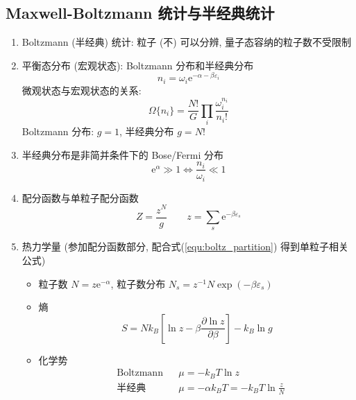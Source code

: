 \documentclass[12pt,a4paper]{article}%
\numberwithin{equation}{section}
\newcommand\e{\mathrm{e}}%
\begin{document}
\subsection[Boltzmann (半经典) 统计]{Maxwell-Boltzmann 统计与半经典统计} %
\label{sub:boltzmann_stat}
\begin{enumerate}
    \item Boltzmann (半经典) 统计: 粒子 (不) 可以分辨, 量子态容纳的粒子数不受限制
    \item 平衡态分布 (宏观状态): Boltzmann 分布和半经典分布
    \begin{equation}
        n_i = \omega_i\e^{-\alpha-\beta\varepsilon_i}
    \end{equation}
    微观状态与宏观状态的关系: 
    \begin{equation}
        \Omega\{n_i\} = \frac{N!}{G}\prod_i \frac{\omega_i^{n_i}}{n_i!}
    \end{equation}
    Boltzmann 分布: $g = 1$, 半经典分布 $g = N!$
    \item 半经典分布是非简并条件下的 Bose/Fermi 分布
    \begin{equation}
        \e^\alpha\gg 1 \Longleftrightarrow \frac{n_i}{\omega_i}\ll 1 %
    \end{equation}
    \item 配分函数与单粒子配分函数
    \begin{equation}\label{equ:boltz_partition}
        Z = \frac{z^N}{g}\qquad z = \sum_s\e^{-\beta\varepsilon_s}
    \end{equation}
    \item 热力学量 (参加配分函数部分, 配合式(\ref{equ:boltz_partition}) 得到单粒子相关公式)
    \begin{itemize}
        \item 粒子数 $N = z\e^{-\alpha}$, 粒子数分布 $N_s = z^{-1}N\exp(-\beta\varepsilon_s)$
        \item 熵
        \begin{equation}
            S = Nk_B\left[\ln z - \beta\frac{\partial\ln z}{\partial\beta}\right] - k_B\ln g
        \end{equation}
        \item 化学势
        \begin{align}
            &\mbox{Boltzmann} && \mu = -k_B T\ln z \\
            &\mbox{半经典}    && \mu = -\alpha k_B T = -k_BT\ln\frac zN\label{equ:mu_semi_cla}
        \end{align}
    \end{itemize}
\end{enumerate}
\end{document}

